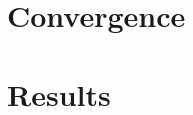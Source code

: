 \documentclass{article}
\begin{document}



\section{Convergence}





\section{Results}


\end{document}
